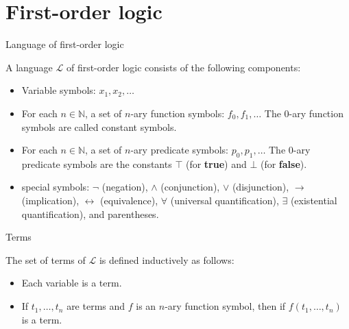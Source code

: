 \documentclass{beamer}
\begin{document}
\section{First-order logic}
\begin{frame}{Language of first-order logic}
  
    A language $\mathscr{L}$ of first-order logic consists of the following components:
    \begin{itemize}
    \item Variable symbols: $x_1, x_2, \ldots$
    \item For each $n\in\mathbb{N}$, a set of $n$-ary function symbols: $f_0, f_1, \ldots$ The 0-ary function symbols are called constant symbols.
    \item For each $n\in\mathbb{N}$, a set of $n$-ary predicate symbols: $p_0, p_1, \ldots$ The 0-ary predicate symbols are the constants $\top$ (for \textbf{true}) and $\bot$ (for \textbf{false}).
    \item special symbols: $\neg$ (negation), $\wedge$ (conjunction), $\vee$ (disjunction), $\rightarrow$ (implication), $\leftrightarrow$ (equivalence), $\forall$ (universal quantification), $\exists$ (existential quantification), and parentheses.
  \end{itemize}

  \end{frame}

  \begin{frame}{Terms}

    The set of terms of $\mathscr{L}$ is defined inductively as follows:
    \begin{itemize}
    \item Each variable is a term.
    \item If $t_1, \ldots, t_n$ are terms and $f$ is an $n$-ary function symbol, then if $f(t_1, \ldots, t_n)$ is a term.
  \end{itemize}
  \end{frame}
\end{document}
